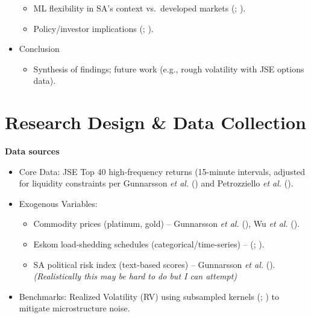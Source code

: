 \documentclass[11pt,preprint]{elsarticle}
\numberwithin{equation}{section}
\numberwithin{figure}{section}
\numberwithin{table}{section}
\def\tightlist{} %
\begin{document}
\begin{itemize}
  \begin{itemize}
  \tightlist
  \item
    ML flexibility in SA's context vs.~developed markets
    (; ).\\
  \item
    Policy/investor implications (; ).
  \end{itemize}
\item
  Conclusion

  \begin{itemize}
  \tightlist
  \item
    Synthesis of findings; future work (e.g., rough volatility with JSE
    options data).
  \end{itemize}
\end{itemize}

\section{Research Design \& Data
Collection}\label{research-design-data-collection}

\textbf{Data sources}

\begin{itemize}
\tightlist
\item
  Core Data: JSE Top 40 high-frequency returns (15-minute intervals,
  adjusted for liquidity constraints per Gunnarsson \emph{et al.}
  () and Petrozziello \emph{et
  al.} ().\\
\item
  Exogenous Variables:

  \begin{itemize}
  \tightlist
  \item
    Commodity prices (platinum, gold) -- Gunnarsson \emph{et al.}
    (), Wu \emph{et al.}
    ().\\
  \item
    Eskom load-shedding schedules (categorical/time-series) --
    (; ).\\
  \item
    SA political risk index (text-based scores) -- Gunnarsson \emph{et
    al.} ().
    \emph{(Realistically this may be hard to do but I can attempt)}\\
  \end{itemize}
\item
  Benchmarks: Realized Volatility (RV) using subsampled kernels
  (; ) to mitigate microstructure noise.
\end{itemize}
\end{document}
